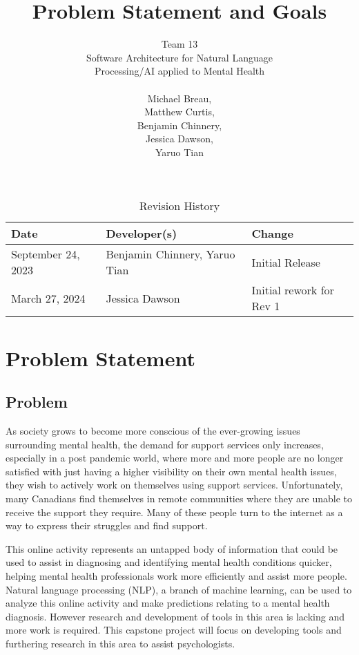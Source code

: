 \documentclass{article}
\title{Problem Statement and Goals\\}
\author{Team 13 \\Software Architecture for Natural Language
\\ Processing/AI applied to Mental Health \\
\\Michael Breau, \\Matthew Curtis, \\Benjamin Chinnery, \\Jessica Dawson, \\Yaruo Tian}
\begin{document}
\maketitle

\begin{table}[hp]
\caption{Revision History} \label{TblRevisionHistory}
\begin{tabularx}{\textwidth}{llX}
\toprule
\textbf{Date} & \textbf{Developer(s)} & \textbf{Change}\\
\midrule
September 24, 2023 &  Benjamin Chinnery, Yaruo Tian & Initial Release\\
March 27, 2024 &  Jessica Dawson & Initial rework for Rev 1\\
\bottomrule
\end{tabularx}
\end{table}

\section{Problem Statement}

\subsection{Problem}

As society grows to become more conscious of the ever-growing issues surrounding mental health, the demand for support services only increases, especially in a post pandemic world, where more and more people are no longer satisfied with just having a higher visibility on their own mental health issues, they wish to actively work on themselves using support services. Unfortunately, many Canadians find themselves in remote communities where they are unable to receive the support they require. Many of these people turn to the internet as a way to express their struggles and find support.

This online activity represents an untapped body of information that could be used to assist in diagnosing and identifying mental health conditions quicker, helping mental health professionals work more efficiently and assist more people. Natural language processing (NLP), a branch of machine learning, can be used to analyze this online activity and make predictions relating to a mental health diagnosis. However research and development of tools in this area is lacking and more work is required. This capstone project will focus on developing tools and furthering research in this area to assist psychologists.
\end{document}
